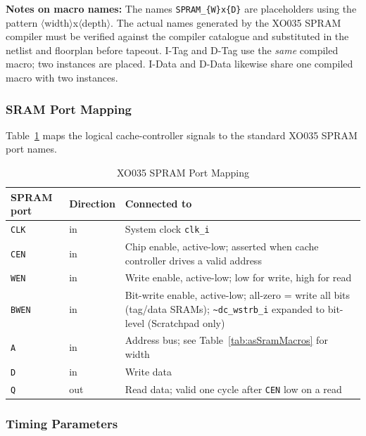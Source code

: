 \textbf{Notes on macro names:}
The names \texttt{SPRAM\_\{W\}x\{D\}} are placeholders using the pattern
$\langle$width$\rangle$x$\langle$depth$\rangle$.
The actual names generated by the XO035 SPRAM compiler must be verified
against the compiler catalogue and substituted in the netlist and
floorplan before tapeout.
I-Tag and D-Tag use the \emph{same} compiled macro; two instances are
placed.
I-Data and D-Data likewise share one compiled macro with two instances.

\subsubsection{SRAM Port Mapping}

Table~\ref{tab:asSramPorts} maps the logical cache-controller signals
to the standard XO035 SPRAM port names.

\begin{table}[H]
\caption{XO035 SPRAM Port Mapping}
\label{tab:asSramPorts}
\centering
\begin{tabularx}{\textwidth}{|l |l |X|}
  \hline
  SPRAM port & Direction & Connected to \\
  \hline
  \hline
  \texttt{CLK}  & in  & System clock \texttt{clk\_i} \\
  \hline
  \texttt{CEN}  & in  & Chip enable, active-low; asserted when cache controller
                        drives a valid address \\
  \hline
  \texttt{WEN}  & in  & Write enable, active-low; low for write, high for read \\
  \hline
  \texttt{BWEN} & in  & Bit-write enable, active-low; all-zero = write all bits
                        (tag/data SRAMs); \texttt{\textasciitilde dc\_wstrb\_i}
                        expanded to bit-level (Scratchpad only) \\
  \hline
  \texttt{A}    & in  & Address bus; see Table~\ref{tab:asSramMacros} for width \\
  \hline
  \texttt{D}    & in  & Write data \\
  \hline
  \texttt{Q}    & out & Read data; valid one cycle after \texttt{CEN} low on a read \\
  \hline
\end{tabularx}
\end{table}

\subsubsection{Timing Parameters}

